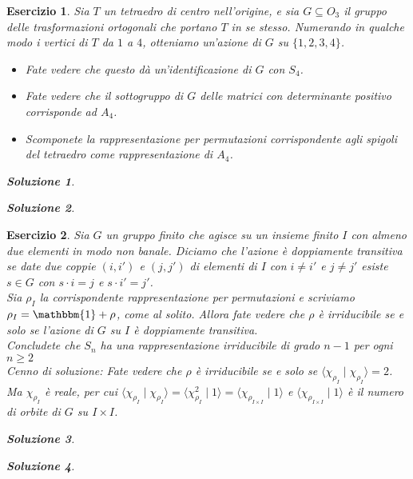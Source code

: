 \documentclass[a4paper]{article}
\theoremstyle{break}
\newtheorem{ex}{{ \Large Esercizio} }
\theoremstyle{plain}
\newtheorem{sol}{Soluzione}[ex]
\begin{document}
\begin{ex}
Sia $T$ un tetraedro di centro nell'origine, e sia $G \subseteq O_3$ il gruppo delle trasformazioni ortogonali che portano $T$ in se stesso. Numerando in qualche modo i vertici di $T$ da $1$ a $4$, otteniamo un’azione di $G$ su $\{1, 2, 3, 4\}$.
\begin{itemize}
\item[(a)] Fate vedere che questo dà un’identificazione di $G$ con $S_4$.

\item[(b)] Fate vedere che il sottogruppo di $G$ delle matrici con determinante positivo corrisponde ad $A_4$.

\item[(c)] Scomponete la rappresentazione per permutazioni corrispondente agli spigoli del tetraedro come rappresentazione di $A_4$.
\end{itemize}

\begin{sol}

\end{sol}

\begin{sol}

\end{sol}


\end{ex}

\begin{ex}
Sia $G$ un gruppo finito che agisce su un insieme finito $I$ con almeno due elementi in modo non banale. Diciamo che l'azione è {\it doppiamente transitiva} se date due coppie $(i, i')$ e $(j, j')$ di elementi di $I$ con $i \neq i'$ e $j \neq j'$ esiste $s \in G$ con $s \cdot i = j$ e $s \cdot i' = j'$. \\
Sia $\rho_I$ la corrispondente rappresentazione per permutazioni e scriviamo $\rho_I = \mathbbm{1} + \rho$, come al solito. Allora fate vedere che $\rho$ è irriducibile se e solo se l'azione di $G$ su $I$ è doppiamente transitiva. \\
Concludete che $S_n$ ha una rappresentazione irriducibile di grado $n-1$ per ogni $n \ge 2$ \\
Cenno di soluzione: Fate vedere che $\rho$ è irriducibile se e solo se $\langle \chi_{\rho_I} \mid \chi_{\rho_I} \rangle = 2$. Ma $\chi_{\rho_I}$ è reale, per cui $\langle \chi_{\rho_I} \mid \chi_{\rho_I} \rangle = \langle \chi_{\rho_I}^2 \mid 1 \rangle = \langle \chi_{\rho_{I\times I}} \mid 1 \rangle$ e $\langle \chi_{\rho_{I\times I}} \mid 1 \rangle$ è il numero di orbite di $G$ su $I \times I$.

\begin{sol}

\end{sol}

\begin{sol}

\end{sol}


\end{ex}
\end{document}
